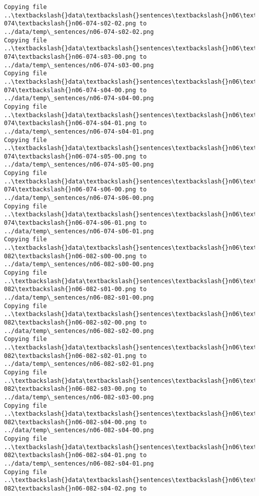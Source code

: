 \documentclass[11pt]{article}
\begin{document}
\begin{Verbatim}[commandchars=\\\{\}]
Copying file ..\textbackslash{}data\textbackslash{}sentences\textbackslash{}n06\textbackslash{}n06-074\textbackslash{}n06-074-s02-02.png to
../data/temp\_sentences/n06-074-s02-02.png
Copying file ..\textbackslash{}data\textbackslash{}sentences\textbackslash{}n06\textbackslash{}n06-074\textbackslash{}n06-074-s03-00.png to
../data/temp\_sentences/n06-074-s03-00.png
Copying file ..\textbackslash{}data\textbackslash{}sentences\textbackslash{}n06\textbackslash{}n06-074\textbackslash{}n06-074-s04-00.png to
../data/temp\_sentences/n06-074-s04-00.png
Copying file ..\textbackslash{}data\textbackslash{}sentences\textbackslash{}n06\textbackslash{}n06-074\textbackslash{}n06-074-s04-01.png to
../data/temp\_sentences/n06-074-s04-01.png
Copying file ..\textbackslash{}data\textbackslash{}sentences\textbackslash{}n06\textbackslash{}n06-074\textbackslash{}n06-074-s05-00.png to
../data/temp\_sentences/n06-074-s05-00.png
Copying file ..\textbackslash{}data\textbackslash{}sentences\textbackslash{}n06\textbackslash{}n06-074\textbackslash{}n06-074-s06-00.png to
../data/temp\_sentences/n06-074-s06-00.png
Copying file ..\textbackslash{}data\textbackslash{}sentences\textbackslash{}n06\textbackslash{}n06-074\textbackslash{}n06-074-s06-01.png to
../data/temp\_sentences/n06-074-s06-01.png
Copying file ..\textbackslash{}data\textbackslash{}sentences\textbackslash{}n06\textbackslash{}n06-082\textbackslash{}n06-082-s00-00.png to
../data/temp\_sentences/n06-082-s00-00.png
Copying file ..\textbackslash{}data\textbackslash{}sentences\textbackslash{}n06\textbackslash{}n06-082\textbackslash{}n06-082-s01-00.png to
../data/temp\_sentences/n06-082-s01-00.png
Copying file ..\textbackslash{}data\textbackslash{}sentences\textbackslash{}n06\textbackslash{}n06-082\textbackslash{}n06-082-s02-00.png to
../data/temp\_sentences/n06-082-s02-00.png
Copying file ..\textbackslash{}data\textbackslash{}sentences\textbackslash{}n06\textbackslash{}n06-082\textbackslash{}n06-082-s02-01.png to
../data/temp\_sentences/n06-082-s02-01.png
Copying file ..\textbackslash{}data\textbackslash{}sentences\textbackslash{}n06\textbackslash{}n06-082\textbackslash{}n06-082-s03-00.png to
../data/temp\_sentences/n06-082-s03-00.png
Copying file ..\textbackslash{}data\textbackslash{}sentences\textbackslash{}n06\textbackslash{}n06-082\textbackslash{}n06-082-s04-00.png to
../data/temp\_sentences/n06-082-s04-00.png
Copying file ..\textbackslash{}data\textbackslash{}sentences\textbackslash{}n06\textbackslash{}n06-082\textbackslash{}n06-082-s04-01.png to
../data/temp\_sentences/n06-082-s04-01.png
Copying file ..\textbackslash{}data\textbackslash{}sentences\textbackslash{}n06\textbackslash{}n06-082\textbackslash{}n06-082-s04-02.png to

\end{Verbatim}
\end{document}
